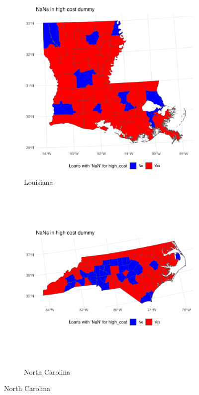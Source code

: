 \documentclass{article}
\begin{document}
\begin{figure}
    \begin{subfigure}{0.9\textwidth}
        \caption{Louisiana}
        \begin{center}
        \includegraphics[scale=0.45]{figures/nans_in_high_cost_dummy_22.pdf}
        \end{center}
    \end{subfigure}

    \begin{subfigure}{0.9\textwidth}

        \caption{North Carolina}
        \begin{center}
            \includegraphics[scale=0.45]{figures/nans_in_high_cost_dummy_37.pdf}
            \end{center}
    \end{subfigure}
        
\end{figure}
\end{document}
